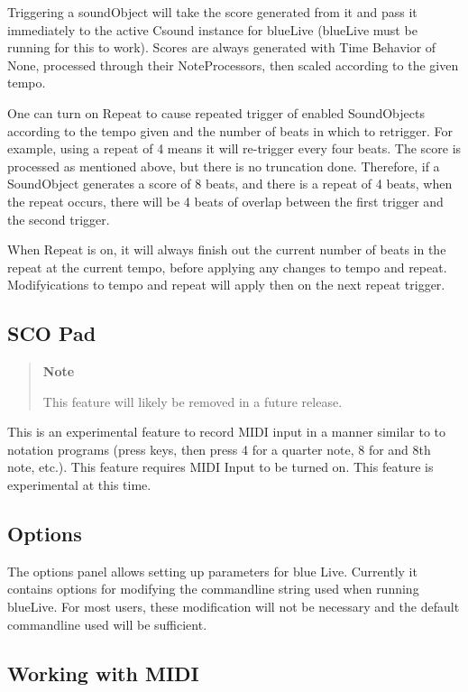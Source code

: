 Triggering a soundObject will take the score generated from it and pass
it immediately to the active Csound instance for blueLive (blueLive must
be running for this to work). Scores are always generated with Time
Behavior of None, processed through their NoteProcessors, then scaled
according to the given tempo.

One can turn on Repeat to cause repeated trigger of enabled SoundObjects
according to the tempo given and the number of beats in which to
retrigger. For example, using a repeat of 4 means it will re-trigger
every four beats. The score is processed as mentioned above, but there
is no truncation done. Therefore, if a SoundObject generates a score of
8 beats, and there is a repeat of 4 beats, when the repeat occurs, there
will be 4 beats of overlap between the first trigger and the second
trigger.

When Repeat is on, it will always finish out the current number of beats
in the repeat at the current tempo, before applying any changes to tempo
and repeat. Modifyications to tempo and repeat will apply then on the
next repeat trigger.

\subsection{SCO Pad}

\begin{quote}
\textbf{Note}

This feature will likely be removed in a future release.
\end{quote}

This is an experimental feature to record MIDI input in a manner similar
to to notation programs (press keys, then press 4 for a quarter note, 8
for and 8th note, etc.). This feature requires MIDI Input to be turned
on. This feature is experimental at this time.

\subsection{Options}

The options panel allows setting up parameters for blue Live. Currently
it contains options for modifying the commandline string used when
running blueLive. For most users, these modification will not be
necessary and the default commandline used will be sufficient.

\subsection{Working with MIDI}

